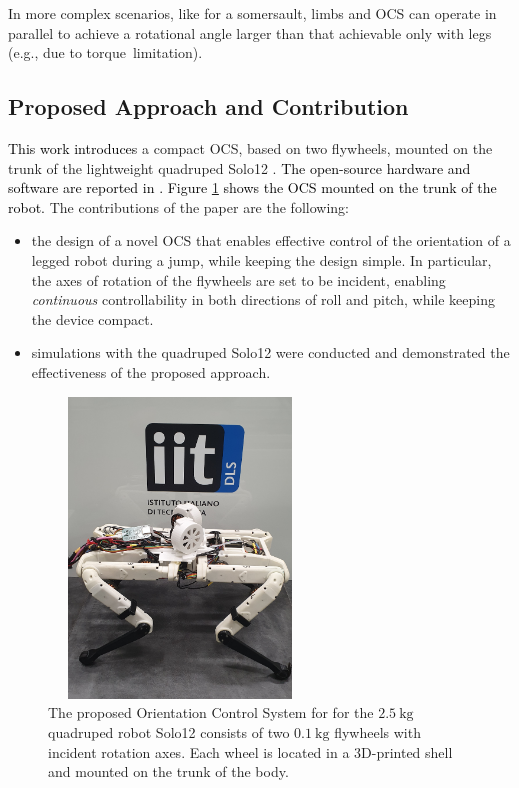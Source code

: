 \documentclass[sensors,article,accept,pdftex,moreauthors]{Definitions/mdpi}
\newcommand{\MF}[1]{\textcolor{black}{#1}}
\begin{document}
In more complex scenarios, like for a somersault, limbs and OCS can operate in parallel to achieve a rotational angle larger than that achievable only with legs (e.g., due to to\mbox{rque limita}tion). 


\subsection{Proposed Approach and Contribution}

\MF{This work introduces} a compact OCS, based on two flywheels, mounted on the trunk of the lightweight quadruped Solo12 \cite{grimminger2020open}. \MF{The open-source hardware and software are reported in \cite{github_solo}. Figure \ref{fig:solo12flywheels} shows the OCS mounted on the trunk of the robot.} The contributions of the paper are the following:
\begin{itemize}
	\item the design of a novel OCS that enables effective control of the orientation of a legged robot during a jump, while keeping the design simple. 
	In particular, the axes of rotation of the flywheels are set to be incident, enabling \textit{continuous} %
 controllability in both directions of roll and pitch, while keeping the device compact.
	\item simulations  with the quadruped Solo12 were conducted and demonstrated the effectiveness of the proposed approach.
\end{itemize}

\begin{figure}[H]%
	\includegraphics[width=7cm,height=8cm,keepaspectratio]{figures/solo_fw_pic_compressed.png}
	\caption{\small The proposed Orientation Control System for 
		for the $2.5 \ \mathrm{kg}$ quadruped robot Solo12 consists of two $0.1 \ \mathrm{kg}$ flywheels with incident rotation axes. Each wheel is located in a 3D-printed shell and mounted on the trunk of the body.}
	\label{fig:solo12flywheels}
\end{figure} 
\end{document}
